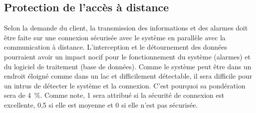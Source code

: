 

\subsection{Protection de l’accès à distance}
\label{s:cdc_sec_protaccdist}

Selon la demande du client, la transmission des informations et des alarmes doit être faite sur une connexion sécurisée avec le système en parallèle avec la communication à distance.
L’interception et le détournement des données pourraient avoir un impact nocif pour le fonctionnement du système (alarmes) et du logiciel de traitement (base de données).
Comme le système peut être dans un endroit éloigné comme dans un lac et difficilement détectable, il sera difficile pour un intrus de détecter le système et la connexion.
C’est pourquoi sa pondération sera de 4~\%.
Comme note, 1 sera attribué si la sécurité de connexion est excellente, 0,5 si elle est moyenne et 0 si elle n’est pas sécurisée.
